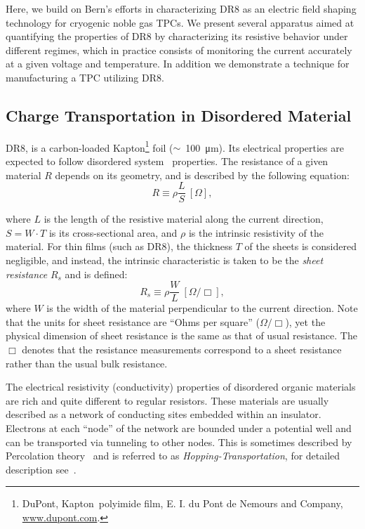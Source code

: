 \documentclass[a4paper,12pt]{article}
\newcommand{\DR}{DR8}
\begin{document}
Here, we build on Bern's efforts in characterizing {\DR} as an electric field shaping technology for cryogenic noble gas TPCs.
We present several apparatus aimed at quantifying the properties of {\DR} by characterizing its resistive behavior under different regimes, which in practice consists of monitoring the current accurately at a given voltage and temperature. 
In addition we demonstrate a technique for manufacturing a TPC utilizing {\DR}.

\subsection{Charge Transportation in Disordered Material}
\label{sec:disorder_Mattrial}

{\DR}, is a carbon-loaded Kapton\footnote{DuPont\texttrademark, Kapton\textregistered \, polyimide film, E. I. du Pont de Nemours and Company, \url{www.dupont.com}.} foil ($\sim$~\SI{100}{\micro\metre}). 
Its electrical properties are expected to follow disordered system~\cite{organicDisorderMaterial} properties. 
The resistance of a given material $R$ depends on its geometry, and is described by the following equation:
\begin{equation}
\label{eq:Res_3D}
R \equiv \rho \frac{L}{S} \ [\Omega],
\end{equation}

where $L$ is the length of the resistive material along the current direction, $S = W \cdot T$ is its cross-sectional area, and $\rho$ is the intrinsic resistivity of the material. 
For thin films (such as {\DR}), the thickness $T$ of the sheets is considered negligible, and instead, the intrinsic characteristic is taken to be the \emph{sheet resistance} $R_s$ and is defined:
\begin{equation}
\label{eq:res_2D}
R_s \equiv \rho \frac{W}{L} \ [\Omega / \Box],
\end{equation}
where $W$ is the width of the material perpendicular to the current direction. 
Note that the units for sheet resistance are ``Ohms per square'' ($\Omega / \Box$), yet the physical dimension of sheet resistance is the same as that of usual resistance. 
The $\Box$ denotes that the resistance measurements correspond to a sheet resistance rather than the usual bulk resistance.

The electrical resistivity (conductivity) properties of disordered organic materials are rich and quite different to regular resistors. 
These materials are usually described as a network of conducting sites embedded within an insulator. 
Electrons at each ``node'' of the network are bounded under a potential well and can be transported via tunneling to other nodes. 
This is sometimes described by Percolation theory~\cite{Havlin1996} and is referred to as \emph{Hopping-Transportation}, for detailed description see~\cite{organicDisorderMaterial,electronicPhotonicMaterials}.
\end{document}
